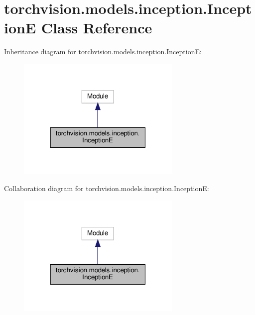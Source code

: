 \hypertarget{classtorchvision_1_1models_1_1inception_1_1InceptionE}{}\section{torchvision.\+models.\+inception.\+InceptionE Class Reference}
\label{classtorchvision_1_1models_1_1inception_1_1InceptionE}


Inheritance diagram for torchvision.\+models.\+inception.\+InceptionE\+:
\nopagebreak
\begin{figure}[H]
\begin{center}
\leavevmode
\includegraphics[width=223pt]{classtorchvision_1_1models_1_1inception_1_1InceptionE__inherit__graph}
\end{center}
\end{figure}


Collaboration diagram for torchvision.\+models.\+inception.\+InceptionE\+:
\nopagebreak
\begin{figure}[H]
\begin{center}
\leavevmode
\includegraphics[width=223pt]{classtorchvision_1_1models_1_1inception_1_1InceptionE__coll__graph}
\end{center}
\end{figure}
